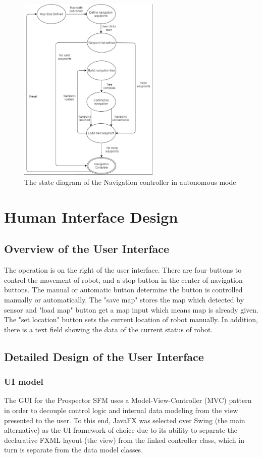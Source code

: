 \documentclass[12pt]{article}
\begin{document}
\begin{figure}[!htb]
\centering\includegraphics[width=0.6\textwidth]{navstate.png}
\caption{The state diagram of the Navigation controller in autonomous mode}
  \label{fig:navstate}
\end{figure}

\FloatBarrier
\section{Human Interface Design}\label{GUI}

\subsection{Overview of the User Interface}
The operation is on the right of the user interface. There are four buttons to control the movement of robot, and a stop button in the center of navigation buttons. The manual or automatic button determine the button is controlled manually or automatically. The "save map" stores the map which detected by sensor and "load map" button get a map input which means map is already given. The "set location" button sets the current location of robot manually. In addition, there is a text field showing the data of the current status of robot.

\subsection{Detailed Design of the User Interface}

\subsubsection {UI model}
The GUI for the Prospector SFM uses a Model-View-Controller (MVC) pattern in order to decouple control logic and internal data modeling from the view presented to the user. To this end, JavaFX was selected over Swing (the main alternative) as the UI framework of choice due to its ability to separate the declarative FXML layout (the view) from the linked controller class, which in turn is separate from the data model classes.
\end{document}
